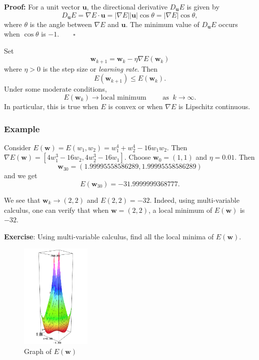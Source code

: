\documentclass[
]{article}
\begin{document}
\textbf{Proof:} For a unit vector \({\boldsymbol{u}}\), the directional
derivative \(D_{\boldsymbol{u}}E\) is given by
\[ D_{\boldsymbol{u}}E= \nabla E \cdot {\boldsymbol{u}}= | \nabla E | |{\boldsymbol{u}}| \cos \theta = | \nabla E | \cos \theta ,\]
where \(\theta\) is the angle between \(\nabla E\) and
\({\boldsymbol{u}}\). The minimum value of \(D_{\boldsymbol{u}}E\)
occurs when \(\cos \theta\) is \(-1\). ~ ~ \(\square\)

Set
\[ {\boldsymbol{w}}_{k+1}={\boldsymbol{w}}_k - \eta \nabla E({\boldsymbol{w}}_k) \]
where \(\eta >0\) is the step size or \emph{learning rate}. Then
\[ E({\boldsymbol{w}}_{k+1}) \le E({\boldsymbol{w}}_{k}).\] Under some
moderate conditions,
\[ E({\boldsymbol{w}}_k) \rightarrow \text{local minimum} \qquad \text{ as }\ k \rightarrow \infty .\]In
particular, this is true when \(E\) is convex or when \(\nabla E\) is
Lipschitz continuous.

\hypertarget{example}{%
\subsubsection{Example}\label{example}}

Consider \(E({\boldsymbol{w}})=E(w_1,w_2)= w_1^4+w_2^4-16w_1w_2\). Then
\(\nabla E({\boldsymbol{w}})= [ 4w_1^3-16w_2, 4w_2^3-16w_1]\). Choose
\({\boldsymbol{w}}_0=(1,1)\) and \(\eta =0.01\). Then
\[ {\boldsymbol{w}}_{30}=(1.99995558586289, 1.99995558586289)\] and we
get \[ E({\boldsymbol{w}}_{30})= -31.9999999368777. \]

We see that \({\boldsymbol{w}}_k \rightarrow (2,2)\) and \(E(2,2)=-32\).
Indeed, using multi-variable calculus, one can verify that when
\({\boldsymbol{w}}=(2,2)\), a local minimum of \(E({\boldsymbol{w}})\)
is \(-32\).

\textbf{Exercise}: Using multi-variable calculus, find all the local
minima of \(E({\boldsymbol{w}})\).

\begin{figure}
\hypertarget{fig:des}{%
\centering
\includegraphics[width=0.3\textwidth,height=\textheight]{descent.png}
\caption{Graph of \(E({\boldsymbol{w}})\)}\label{fig:des}
}
\end{figure}
\end{document}
